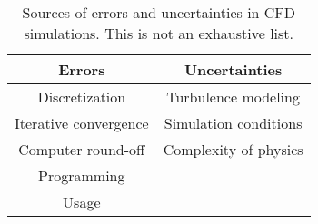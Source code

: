 \begin{table}[]
    \centering
    \def\arraystretch{1.2}
    \begin{tabular}{c|c}
         \textbf{Errors} &  \textbf{Uncertainties} \\ \hline
         Discretization & Turbulence modeling \\
         Iterative convergence & Simulation conditions \\
         Computer round-off & Complexity of physics \\
         Programming & \\
         Usage & \\
    \end{tabular}
    \caption{Sources of errors and uncertainties in CFD simulations. This is not an exhaustive list.}
    \label{tab:errors_uncert}
\end{table}